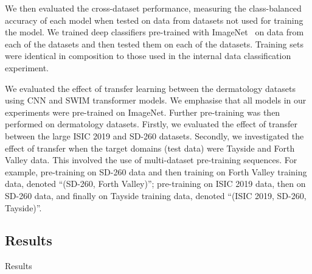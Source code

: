 We then evaluated the cross-dataset performance, measuring the class-balanced accuracy of each model when tested on data from datasets not used for training the model. We trained deep classifiers pre-trained with ImageNet~\citep{deng2009imagenet} on data from each of the datasets and then tested them on each of the datasets. Training sets were identical in composition to those used in the internal data classification experiment.

We evaluated the effect of transfer learning between the dermatology datasets using CNN and SWIM transformer models. We emphasise that all models in our experiments were pre-trained on ImageNet. Further pre-training was then performed on dermatology datasets. Firstly, we evaluated the effect of transfer between the large ISIC 2019 and SD-260 datasets. Secondly, we investigated the effect of transfer when the target domains (test data) were Tayside and Forth Valley data. This involved the use of multi-dataset pre-training sequences. For example, pre-training on SD-260 data and then training on Forth Valley training data, denoted “(SD-260, Forth Valley)”; pre-training on ISIC 2019 data, then on SD-260 data, and finally on Tayside training data, denoted “(ISIC 2019, SD-260, Tayside)”.

\subsection{Results}
\label{subsec:generalisation_results}
Results

\begin{table}[h]
	\centering
	\caption{Class-balanced accuracy when training and testing on the various datasets.}
	\label{tab:generalisation_results}
\end{table}

